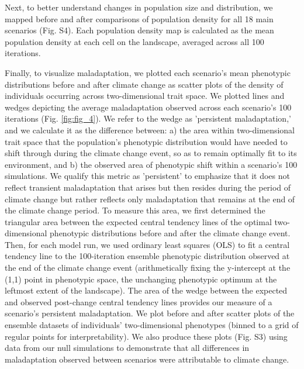 \documentclass[9pt,twocolumn,twoside,lineno]{pnas-new}
\begin{document}
{Next, to better understand changes in population size and distribution,
we mapped before and after comparisons of population density for all 18
main scenarios (Fig. S4).
Each population density map is calculated as
the mean population density at each cell on the landscape,
averaged across all 100 iterations.

Finally, to visualize maladaptation, we plotted each scenario's
mean phenotypic distributions before and after climate change as scatter plots of the density of individuals occurring across
two-dimensional trait space. We plotted lines and wedges depicting the average maladaptation
observed across each scenario's 100 iterations (Fig. \ref{fig:fig_4}).
We refer to the wedge as 'persistent maladaptation,'
and we calculate it as the difference between: a) the area 
within two-dimensional trait space that the population’s phenotypic distribution 
would have needed to shift through during the climate change event, so as to remain 
optimally fit to its environment, and b) the observed area of phenotypic shift within
a scenario's 100 simulations.
We qualify this metric as 'persistent' to emphasize that it does
not reflect transient maladaptation that arises but then
resides during the period of climate change but rather reflects
only maladaptation that remains at the end of the climate change period.
To measure this area, we first determined the triangular area between 
the expected central tendency lines of the optimal two-dimensional phenotypic distributions
before and after the climate change event.
Then, for each model run, we used ordinary least squares (OLS)
to fit a central tendency line to the 100-iteration ensemble phenotypic distribution
observed at the end of the climate change event
(arithmetically fixing the y-intercept at the (1,1) point in phenotypic 
space, the unchanging phenotypic optimum at the leftmost extent of the landscape).
The area of the wedge between the expected and observed post-change central tendency
lines provides our measure of a scenario's persistent maladaptation.
We plot before and after scatter plots of the ensemble datasets
of individuals' two-dimensional phenotypes
(binned to a grid of regular points for interpretability).
We also produce these plots (Fig. S3) using data from our null simulations to demonstrate that all differences
in maladaptation observed between scenarios were attributable to climate change.

}
\end{document}
